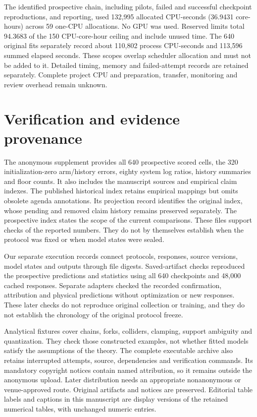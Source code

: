 The identified prospective chain, including pilots, failed and successful
checkpoint reproductions, and reporting, used 132,995 allocated CPU-seconds
(36.9431 core-hours) across 59 one-CPU allocations. No GPU was used. Reserved
limits total 94.3683 of the 150 CPU-core-hour ceiling and include unused time.
The 640 original fits separately record about 110,802 process CPU-seconds and
113,596 summed elapsed seconds. These scopes overlap scheduler allocation and
must not be added to it. Detailed timing, memory and failed-attempt records are
retained separately. Complete project CPU and preparation, transfer, monitoring
and review overhead remain unknown.

\section{Verification and evidence provenance}
\label{app:provenance}
The anonymous supplement provides all 640 prospective scored cells, the 320
initialization-zero arm/history errors, eighty system log ratios, history
summaries and floor counts. It also includes the manuscript sources and empirical
claim indexes. The published historical index retains empirical mappings but
omits obsolete agenda annotations. Its projection record identifies the original
index, whose pending and removed claim history remains preserved separately.
The prospective index states the scope of the current comparisons. These files
support checks of the reported numbers. They do not
by themselves establish when the protocol was fixed or when model states were
sealed.

Our separate execution records connect protocols, responses, source versions,
model states and outputs through file digests. Saved-artifact checks reproduced
the prospective predictions and statistics using all 640 checkpoints and 48,000
cached responses. Separate adapters checked the recorded confirmation,
attribution and physical predictions without optimization or new responses.
These later checks do not reproduce original collection or training, and they
do not establish the chronology of the original protocol freeze.

Analytical fixtures cover chains, forks, colliders, clamping, support ambiguity
and quantization. They check those constructed examples, not whether fitted
models satisfy the assumptions of the theory. The complete executable archive
also retains interrupted attempts, source, dependencies and verification commands.
Its mandatory copyright notices contain named attribution, so it remains
outside the anonymous upload. Later distribution needs an appropriate
nonanonymous or venue-approved route. Original artifacts and notices are
preserved. Editorial table labels and captions in this manuscript are display
versions of the retained numerical tables, with unchanged numeric entries.

